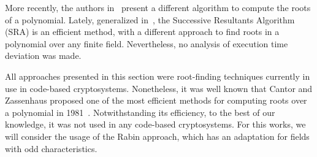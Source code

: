 More recently, the authors in~\cite{petit2014finding} present a different algorithm to compute the roots of a polynomial. Lately, generalized in~\cite{petit2016finding}, the Successive Resultants Algorithm (SRA) is an efficient method, with a different approach to find roots in a polynomial over any finite field. Nevertheless, no analysis of execution time deviation was made.

All approaches presented in this section were root-finding techniques currently in use in code-based cryptosystems. Nonetheless, it was well known that Cantor and Zassenhaus proposed one of the most efficient methods for computing roots over a polynomial in 1981~\cite{cantor1981new}. Notwithstanding its efficiency, to the best of our knowledge, it was not used in any code-based cryptosystems. For this works, we will consider the usage of the Rabin approach, which has an adaptation for fields with odd characteristics.